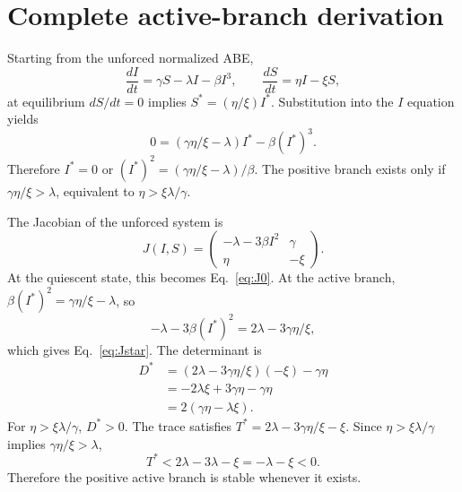 \documentclass[11pt]{article}
\begin{document}
\clearpage
\appendix
\section{Complete active-branch derivation}
Starting from the unforced normalized ABE,
\begin{equation*}
\frac{dI}{dt}=\gamma S-\lambda I-\beta I^3,\qquad \frac{dS}{dt}=\eta I-\xi S,
\end{equation*}
at equilibrium $dS/dt=0$ implies $S^*=(\eta/\xi)I^*$. Substitution into the $I$ equation yields
\begin{equation*}
0=(\gamma\eta/\xi-\lambda)I^*-\beta(I^*)^3.
\end{equation*}
Therefore $I^*=0$ or $(I^*)^2=(\gamma\eta/\xi-\lambda)/\beta$. The positive branch exists only if $\gamma\eta/\xi>\lambda$, equivalent to $\eta>\xi\lambda/\gamma$.

The Jacobian of the unforced system is
\begin{equation*}
J(I,S)=\begin{pmatrix}-\lambda-3\beta I^2 & \gamma\\ \eta & -\xi\end{pmatrix}.
\end{equation*}
At the quiescent state, this becomes Eq.~\eqref{eq:J0}. At the active branch, $\beta(I^*)^2=\gamma\eta/\xi-\lambda$, so
\begin{equation*}
-\lambda-3\beta(I^*)^2=2\lambda-3\gamma\eta/\xi,
\end{equation*}
which gives Eq.~\eqref{eq:Jstar}. The determinant is
\begin{align*}
D^*&=(2\lambda-3\gamma\eta/\xi)(-\xi)-\gamma\eta\\
&=-2\lambda\xi+3\gamma\eta-\gamma\eta\\
&=2(\gamma\eta-\lambda\xi).
\end{align*}
For $\eta>\xi\lambda/\gamma$, $D^*>0$. The trace satisfies $T^*=2\lambda-3\gamma\eta/\xi-\xi$. Since $\eta>\xi\lambda/\gamma$ implies $\gamma\eta/\xi>\lambda$,
\begin{equation*}
T^*<2\lambda-3\lambda-\xi=-\lambda-\xi<0.
\end{equation*}
Therefore the positive active branch is stable whenever it exists.

\clearpage
\end{document}

